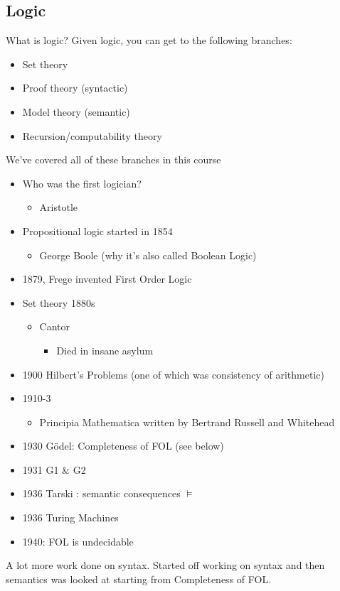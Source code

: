 \documentclass[11pt]{article}
\begin{document}
\subsection{Logic}
\label{sec:orgda53e49}
What is logic?
Given logic, you can get to the following branches:
\begin{itemize}
\item Set theory
\item Proof theory (syntactic)
\item Model theory (semantic)
\item Recursion/computability theory
\end{itemize}
We've covered all of these branches in this course
\begin{itemize}
\item Who was the first logician?
\begin{itemize}
\item Aristotle
\end{itemize}
\item Propositional logic started in 1854
\begin{itemize}
\item George Boole (why it's also called Boolean Logic)
\end{itemize}
\item 1879, Frege invented First Order Logic
\item Set theory 1880s
\begin{itemize}
\item Cantor
\begin{itemize}
\item Died in insane asylum
\end{itemize}
\end{itemize}
\item 1900 Hilbert's Problems (one of which was consistency of arithmetic)
\item 1910-3
\begin{itemize}
\item Principia Mathematica written by Bertrand Russell and Whitehead
\end{itemize}
\item 1930 Gödel: Completeness of FOL (see below)
\item 1931 G1 \& G2
\item 1936 Tarski : semantic consequences \(\models\)
\item 1936 Turing Machines
\item 1940: FOL is undecidable
\end{itemize}
A lot more work done on syntax. Started off working on syntax and then semantics was looked at starting from Completeness of FOL.
\end{document}
